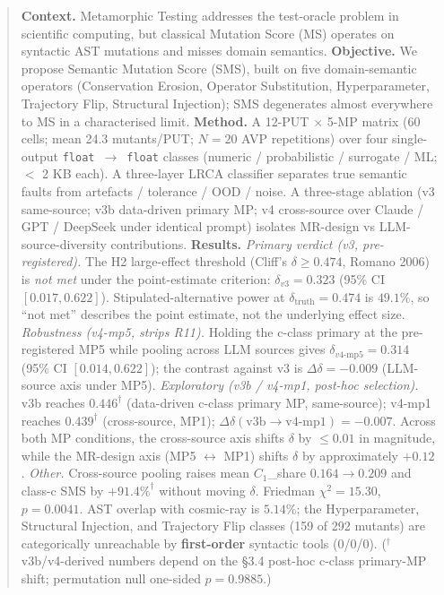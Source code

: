 \documentclass[review,12pt,authoryear]{elsarticle}
\begin{document}
\begin{frontmatter}
\begin{abstract}
\noindent\textbf{Context.} Metamorphic Testing addresses the test-oracle problem in scientific computing, but classical Mutation Score (MS) operates on syntactic AST mutations and misses domain semantics.
\textbf{Objective.} We propose Semantic Mutation Score (SMS), built on five domain-semantic operators (Conservation Erosion, Operator Substitution, Hyperparameter, Trajectory Flip, Structural Injection); SMS degenerates almost everywhere to MS in a characterised limit.
\textbf{Method.} A 12-PUT $\times$ 5-MP matrix (60 cells; mean 24.3 mutants/PUT; $N=20$ AVP repetitions) over four single-output \texttt{float}~$\to$~\texttt{float} classes (numeric / probabilistic / surrogate / ML; $<$ 2 KB each). A three-layer LRCA classifier separates true semantic faults from artefacts / tolerance / OOD / noise. A three-stage ablation (v3 same-source; v3b data-driven primary MP; v4 cross-source over Claude / GPT / DeepSeek under identical prompt) isolates MR-design vs LLM-source-diversity contributions.
\textbf{Results.}
\textit{Primary verdict (v3, pre-registered).} The H2 large-effect threshold (Cliff's $\delta \geq 0.474$, Romano 2006) is \emph{not met} under the point-estimate criterion: $\delta_{v3} = 0.323$ (95\% CI $[0.017, 0.622]$). Stipulated-alternative power at $\delta_{\text{truth}} = 0.474$ is $49.1\%$, so ``not met'' describes the point estimate, not the underlying effect size.
\textit{Robustness (v4-mp5, strips R11).} Holding the c-class primary at the pre-registered MP5 while pooling across LLM sources gives $\delta_{v4\text{-mp5}} = 0.314$ (95\% CI $[0.014, 0.622]$); the contrast against v3 is $\Delta\delta = -0.009$ (LLM-source axis under MP5).
\textit{Exploratory (v3b / v4-mp1, post-hoc selection).} v3b reaches $0.446^{\dagger}$ (data-driven c-class primary MP, same-source); v4-mp1 reaches $0.439^{\dagger}$ (cross-source, MP1); $\Delta\delta(\text{v3b}\to\text{v4-mp1}) = -0.007$. Across both MP conditions, the cross-source axis shifts $\delta$ by $\leq 0.01$ in magnitude, while the MR-design axis (MP5 $\leftrightarrow$ MP1) shifts $\delta$ by approximately $+0.12$.
\textit{Other.} Cross-source pooling raises mean $C_1$\_share $0.164 \to 0.209$ and class-c SMS by $+91.4\%^{\dagger}$ without moving $\delta$. Friedman $\chi^2 = 15.30$, $p = 0.0041$. AST overlap with cosmic-ray is $5.14\%$; the Hyperparameter, Structural Injection, and Trajectory Flip classes (159 of 292 mutants) are categorically unreachable by \textbf{first-order} syntactic tools (0/0/0). ($^{\dagger}$ v3b/v4-derived numbers depend on the \S3.4 post-hoc c-class primary-MP shift; permutation null one-sided $p = 0.9885$.)

\end{abstract}
\end{frontmatter}
\end{document}
